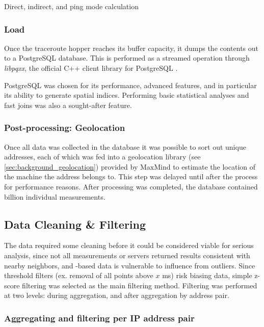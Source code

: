 \begin{code}[h]
    \caption{Direct, indirect, and ping mode calculation}
    \label{code:rtt_calculation}
\end{code}

\subsubsection{Load} Once the traceroute hopper reaches its buffer capacity, it dumps the contents out to a PostgreSQL database. This is performed as a streamed operation through \textit{libpqxx}, the official C++ client library for PostgreSQL \cite{Vermeulen2019a}. 

PostgreSQL was chosen for its performance, advanced features, and in particular its ability to generate spatial indices. Performing basic statistical analyses and fast joins was also a sought-after feature.

\subsubsection{Post-processing: Geolocation}
Once all data was collected in the database it was possible to sort out unique \ip addresses, each of which was fed into a geolocation library (see \cref{sec:background_geolocation}) provided by MaxMind to estimate the location of the machine the \ip address belongs to. This step was delayed until after the \etl process for performance reasons. After processing was completed, the database contained  billion individual \rtt measurements.

\subsection{Data Cleaning \& Filtering}

The data required some cleaning before it could be considered viable for serious analysis, since not all measurements or servers returned results consistent with nearby neighbors, and \rtt-based data is vulnerable to influence from outliers. Since threshold filters (ex. removal of all points above $x$ ms) risk biasing data, simple z-score filtering was selected as the main filtering method. Filtering was performed at two levels: during aggregation, and after aggregation by \ip address pair.

\subsubsection{Aggregating and filtering per IP address pair}

